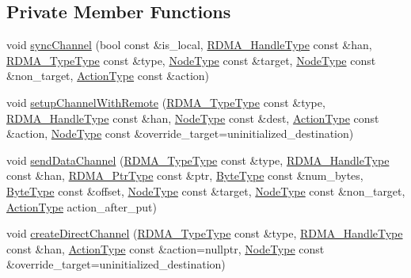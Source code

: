 \subsection*{Private Member Functions}
\begin{DoxyCompactItemize}
\item 
void \hyperlink{structvt_1_1rdma_1_1_r_d_m_a_manager_a4dd6beec7e4e1d3cc4c0ad3e8d0e7837}{sync\+Channel} (bool const \&is\+\_\+local, \hyperlink{namespacevt_a10442579ec4e7ebef223818e64bcf908}{R\+D\+M\+A\+\_\+\+Handle\+Type} const \&han, \hyperlink{namespacevt_1_1rdma_ac848e1d9da43db6294bd06f83e5d3946}{R\+D\+M\+A\+\_\+\+Type\+Type} const \&type, \hyperlink{namespacevt_a866da9d0efc19c0a1ce79e9e492f47e2}{Node\+Type} const \&target, \hyperlink{namespacevt_a866da9d0efc19c0a1ce79e9e492f47e2}{Node\+Type} const \&non\+\_\+target, \hyperlink{namespacevt_ae0a5a7b18cc99d7b732cb4d44f46b0f3}{Action\+Type} const \&action)
\item 
void \hyperlink{structvt_1_1rdma_1_1_r_d_m_a_manager_abd4b573102bf0a4c7dd0687d257f7a0d}{setup\+Channel\+With\+Remote} (\hyperlink{namespacevt_1_1rdma_ac848e1d9da43db6294bd06f83e5d3946}{R\+D\+M\+A\+\_\+\+Type\+Type} const \&type, \hyperlink{namespacevt_a10442579ec4e7ebef223818e64bcf908}{R\+D\+M\+A\+\_\+\+Handle\+Type} const \&han, \hyperlink{namespacevt_a866da9d0efc19c0a1ce79e9e492f47e2}{Node\+Type} const \&dest, \hyperlink{namespacevt_ae0a5a7b18cc99d7b732cb4d44f46b0f3}{Action\+Type} const \&action, \hyperlink{namespacevt_a866da9d0efc19c0a1ce79e9e492f47e2}{Node\+Type} const \&override\+\_\+target=uninitialized\+\_\+destination)
\item 
void \hyperlink{structvt_1_1rdma_1_1_r_d_m_a_manager_acef2971a0d793bc8462beac8ef03ef51}{send\+Data\+Channel} (\hyperlink{namespacevt_1_1rdma_ac848e1d9da43db6294bd06f83e5d3946}{R\+D\+M\+A\+\_\+\+Type\+Type} const \&type, \hyperlink{namespacevt_a10442579ec4e7ebef223818e64bcf908}{R\+D\+M\+A\+\_\+\+Handle\+Type} const \&han, \hyperlink{namespacevt_a9e2c953286c7616f7c218e9951790776}{R\+D\+M\+A\+\_\+\+Ptr\+Type} const \&ptr, \hyperlink{namespacevt_aab8d55968084610ce3b17057981e9300}{Byte\+Type} const \&num\+\_\+bytes, \hyperlink{namespacevt_aab8d55968084610ce3b17057981e9300}{Byte\+Type} const \&offset, \hyperlink{namespacevt_a866da9d0efc19c0a1ce79e9e492f47e2}{Node\+Type} const \&target, \hyperlink{namespacevt_a866da9d0efc19c0a1ce79e9e492f47e2}{Node\+Type} const \&non\+\_\+target, \hyperlink{namespacevt_ae0a5a7b18cc99d7b732cb4d44f46b0f3}{Action\+Type} action\+\_\+after\+\_\+put)
\item 
void \hyperlink{structvt_1_1rdma_1_1_r_d_m_a_manager_a0007e2a8fba26477bd9bb52887e855e3}{create\+Direct\+Channel} (\hyperlink{namespacevt_1_1rdma_ac848e1d9da43db6294bd06f83e5d3946}{R\+D\+M\+A\+\_\+\+Type\+Type} const \&type, \hyperlink{namespacevt_a10442579ec4e7ebef223818e64bcf908}{R\+D\+M\+A\+\_\+\+Handle\+Type} const \&han, \hyperlink{namespacevt_ae0a5a7b18cc99d7b732cb4d44f46b0f3}{Action\+Type} const \&action=nullptr, \hyperlink{namespacevt_a866da9d0efc19c0a1ce79e9e492f47e2}{Node\+Type} const \&override\+\_\+target=uninitialized\+\_\+destination)

\end{DoxyCompactItemize}
